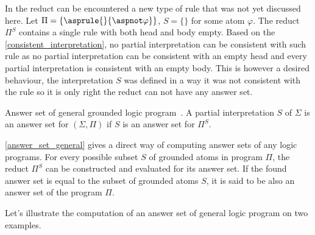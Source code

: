 \begin{example}
    In the reduct can be encountered a new type of rule that was not yet discussed here.
    Let $\Pi = \{\asprule{}{\aspnot \varphi}\}$, $S = \{\}$ for some atom $\varphi$.
    The reduct $\Pi^S$ contains
    a single rule with both head and body empty.
    Based on the \cref{consistent_interpretation},
    no partial interpretation can be consistent
    with such rule as no partial interpretation can be consistent with an empty head
    and every partial interpretation is consistent with an empty body.
    This is however a desired behaviour, the interpretation $S$ was defined
    in a way it was not consistent with the rule so it is only right
    the reduct can not have any answer set.
\end{example}

\begin{definition}{Answer set of general grounded logic program~\cite{KRHandbook}.}%
    \label{answer_set_general}
    A partial interpretation $S$ of $\Sigma$ is an answer set for $(\Sigma, \Pi)$
    if $S$ is an answer set for $\Pi^S$.
\end{definition}

\cref{answer_set_general} gives a direct way of computing answer sets
of any logic programs. For every possible subset $S$ of grounded atoms in program $\Pi$,
the reduct $\Pi^S$ can be constructed and evaluated for its answer set.
If the found answer set is equal to the subset of grounded atoms $S$, it is said
to be also an answer set of the program $\Pi$.

Let's illustrate the computation of an answer set of general logic program on two examples.


